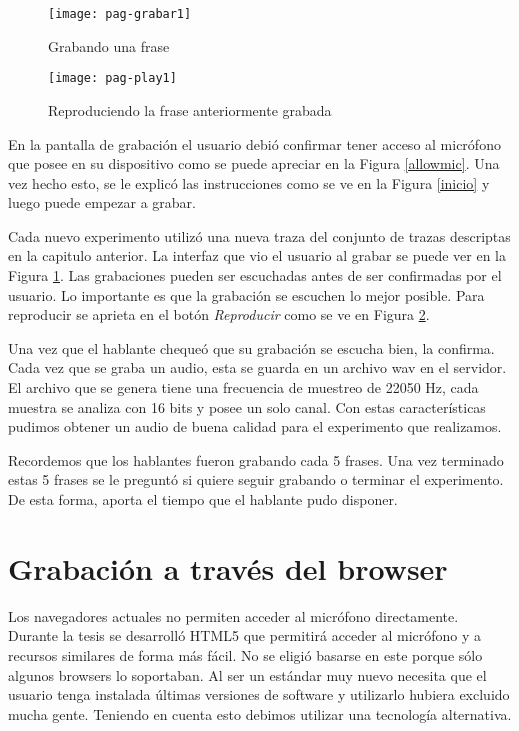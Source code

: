 \begin{figure}[h!]
    \centerline{\texttt{[image: pag-grabar1]} }
    \caption{Grabando una frase}
    \label{grabando}
\end{figure}

\begin{figure}[h!]
    \centerline{\texttt{[image: pag-play1]} }
    \caption{Reproduciendo la frase anteriormente grabada}
    \label{reproduciendo}
\end{figure}

En la pantalla de grabación el usuario debió confirmar tener acceso al micrófono que posee en su dispositivo como se puede apreciar en la Figura \ref{allowmic}. Una vez hecho esto, se le explicó las instrucciones como se ve en la Figura \ref{inicio} y luego puede empezar a grabar. 

Cada nuevo experimento utilizó una nueva traza del conjunto de trazas descriptas en la capitulo anterior. La interfaz que vio el usuario al grabar se puede ver en la Figura \ref{grabando}. Las grabaciones pueden ser escuchadas antes de ser confirmadas por el usuario. Lo importante es que la grabación se escuchen lo mejor posible. Para reproducir se aprieta en el botón \textit{Reproducir} como se ve en Figura \ref{reproduciendo}. 

Una vez que el hablante chequeó que su grabación se escucha bien, la confirma. Cada vez que se graba un audio, esta se guarda en un archivo wav en el servidor. El archivo que se genera tiene una frecuencia de muestreo de 22050 Hz, cada muestra se analiza con 16 bits y posee un solo canal. Con estas características pudimos obtener un audio de buena calidad para el experimento que realizamos.

Recordemos que los hablantes fueron grabando cada 5 frases. Una vez terminado estas 5 frases se le preguntó si quiere seguir grabando o terminar el experimento. De esta forma, aporta el tiempo que el hablante pudo disponer.

\section{Grabación a través del browser}

Los navegadores actuales no permiten acceder al micrófono directamente. Durante la tesis se desarrolló HTML5 que permitirá acceder al micrófono y a recursos similares de forma más fácil. No se eligió basarse en este porque sólo algunos browsers lo soportaban. Al ser un estándar muy nuevo necesita que el usuario tenga instalada últimas versiones de software y utilizarlo hubiera excluido mucha gente. Teniendo en cuenta esto debimos utilizar una tecnología alternativa. 

